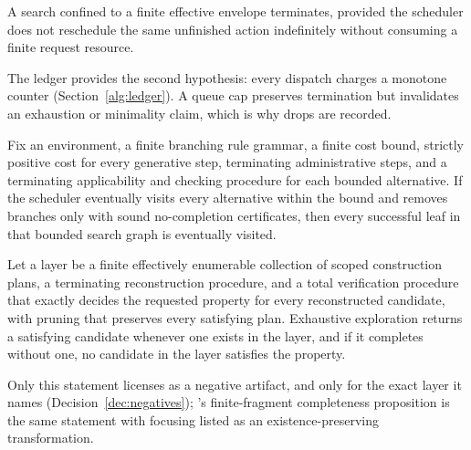 \begin{proposition}
A search confined to a finite effective envelope terminates, provided the scheduler does not reschedule the same unfinished action indefinitely without consuming a finite request resource.
\end{proposition}
The ledger provides the second hypothesis: every dispatch charges a monotone counter (Section~\ref{alg:ledger}). A queue cap preserves termination but invalidates an exhaustion or minimality claim, which is why drops are recorded.

\begin{proposition}
Fix an environment, a finite branching rule grammar, a finite cost bound, strictly positive cost for every generative step, terminating administrative steps, and a terminating applicability and checking procedure for each bounded alternative. If the scheduler eventually visits every alternative within the bound and removes branches only with sound no-completion certificates, then every successful leaf in that bounded search graph is eventually visited.
\end{proposition}

\begin{theorem}
Let a layer be a finite effectively enumerable collection of scoped construction plans, a terminating reconstruction procedure, and a total verification procedure that exactly decides the requested property for every reconstructed candidate, with pruning that preserves every satisfying plan. Exhaustive exploration returns a satisfying candidate whenever one exists in the layer, and if it completes without one, no candidate in the layer satisfies the property.
\end{theorem}
Only this statement licenses  as a negative artifact, and only for the exact layer it names (Decision~\ref{dec:negatives}); 's finite-fragment completeness proposition is the same statement with focusing listed as an existence-preserving transformation.

